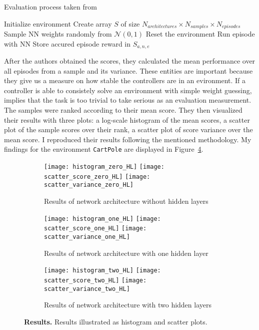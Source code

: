 \begin{algorithm}
\caption{Evaluation process taken from \citet{oller_analyzing_2020}}
\begin{algorithmic}[1]
\State Initialize environment
\State Create array $S$ of size $N_{architectures} \times N_{samples} \times N_{episodes}$
    \State Sample NN weights randomly from $\mathcal{N}(0,1)$
      \State Reset the environment
      \State Run episode with NN
      \State Store accured episode reward in $S_{a,n,e}$
    \EndFor
\EndFor
\end{algorithmic}
\label{alg:environment-evaluation}
\end{algorithm}

After the authors obtained the scores, they calculated the mean performance over all episodes from a sample and its variance. These entities are important because they give us a measure on how stable the controllers are in an evironment. If a controller is able to consistely solve an environment with simple weight guessing, implies that the task is too trivial to take serious as an evaluation measurement. The samples were ranked according to their mean score. They then visualized their results with three plots: a log-scale histogram of the mean scores, a scatter plot of the sample scores over their rank, a scatter plot of score variance over the mean score. I reproduced their results following the mentioned methodology. My findings for the environment \verb|CartPole| are displayed in Figure~\ref{fig:plots_reproduced}.

\begin{figure}[ht]
\centering
\begin{subfigure}{\textwidth}
  \centering
  \texttt{[image: histogram\_zero\_HL]}
  \texttt{[image: scatter\_score\_zero\_HL]}
  \texttt{[image: scatter\_variance\_zero\_HL]}
    \caption{Results of network architecture without hidden layers}
    \label{fig:plots_reproduced_first}
\end{subfigure}
\begin{subfigure}{\textwidth}
  \centering
  \texttt{[image: histogram\_one\_HL]}
  \texttt{[image: scatter\_score\_one\_HL]}
  \texttt{[image: scatter\_variance\_one\_HL]}
    \caption{Results of network architecture with one hidden layer}
    \label{fig:plots_reproduced_second}
\end{subfigure}
\begin{subfigure}{\textwidth}
  \centering
  \texttt{[image: histogram\_two\_HL]}
  \texttt{[image: scatter\_score\_two\_HL]}
  \texttt{[image: scatter\_variance\_two\_HL]}
    \caption{Results of network architecture with two hidden layers}
    \label{fig:plots_reproduced_third}
\end{subfigure}
\caption[Reproduced Plots]{
  \textbf{Results.}
  Results illustrated as histogram and scatter plots.
}
\label{fig:plots_reproduced}
\end{figure}


